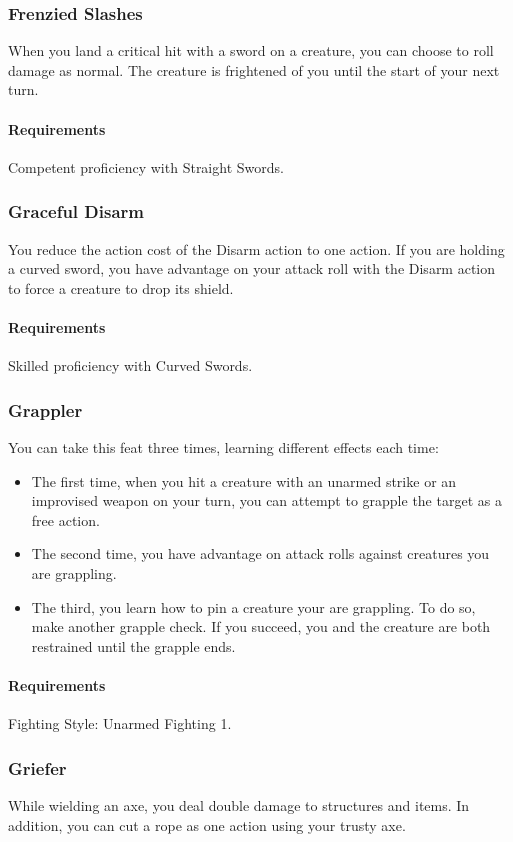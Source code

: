 \subsubsection{Frenzied Slashes} \label{feat::frenziedslashes}
    When you land a critical hit with a sword on a creature, you can choose to roll damage as normal.
    The creature is frightened of you until the start of your next turn.
    \paragraph{Requirements} Competent proficiency with Straight Swords.
\subsubsection{Graceful Disarm} \label{feat::gracefuldisarm}
    You reduce the action cost of the Disarm action to one action.
    If you are holding a curved sword, you have advantage on your attack roll with the Disarm action to force a creature to drop its shield.
    \paragraph{Requirements} Skilled proficiency with Curved Swords.
\subsubsection{Grappler} \label{feat::grappler}
    You can take this feat three times, learning different effects each time:
    \begin{itemize}
        \item The first time, when you hit a creature with an unarmed strike or an improvised weapon on your turn, you can attempt to grapple the target as a free action.
        \item The second time, you have advantage on attack rolls against creatures you are grappling.
        \item The third, you learn how to pin a creature your are grappling.
        To do so, make another grapple check.
        If you succeed, you and the creature are both restrained until the grapple ends.
    \end{itemize}
    \paragraph{Requirements} Fighting Style: Unarmed Fighting 1.
\subsubsection{Griefer} \label{feat::griefer}
    While wielding an axe, you deal double damage to structures and items.
    In addition, you can cut a rope as one action using your trusty axe.
